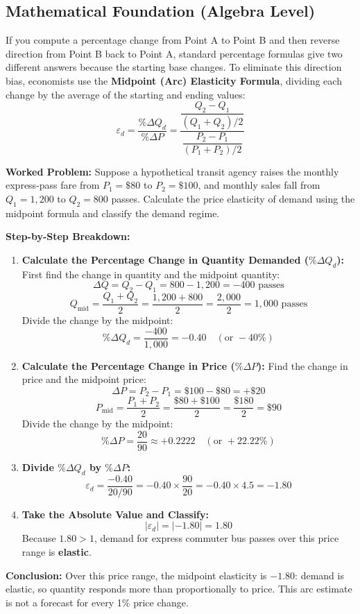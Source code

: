 \documentclass[11pt,letterpaper]{article}
\begin{document}
\subsection*{Mathematical Foundation (Algebra Level)}
If you compute a percentage change from Point A to Point B and then reverse direction from Point B back to Point A, standard percentage formulas give two different answers because the starting base changes. To eliminate this direction bias, economists use the \textbf{Midpoint (Arc) Elasticity Formula}, dividing each change by the average of the starting and ending values:
\begin{equation}
\varepsilon_d = \frac{\%\Delta Q_d}{\%\Delta P} = \frac{\dfrac{Q_2 - Q_1}{(Q_1 + Q_2)/2}}{\dfrac{P_2 - P_1}{(P_1 + P_2)/2}}
\end{equation}

\noindent\textbf{Worked Problem:}
Suppose a hypothetical transit agency raises the monthly express-pass fare from $P_1 = \$80$ to $P_2 = \$100$, and monthly sales fall from $Q_1 = 1{,}200$ to $Q_2 = 800$ passes. Calculate the price elasticity of demand using the midpoint formula and classify the demand regime.

\noindent\textbf{Step-by-Step Breakdown:}
\begin{enumerate}
    \item \textbf{Calculate the Percentage Change in Quantity Demanded ($\%\Delta Q_d$):}
    First find the change in quantity and the midpoint quantity:
    \[
    \Delta Q = Q_2 - Q_1 = 800 - 1{,}200 = -400\text{ passes}
    \]
    \[
    Q_{\text{mid}} = \frac{Q_1 + Q_2}{2} = \frac{1{,}200 + 800}{2} = \frac{2{,}000}{2} = 1{,}000\text{ passes}
    \]
    Divide the change by the midpoint:
    \[
    \%\Delta Q_d = \frac{-400}{1{,}000} = -0.40 \quad (\text{or } -40\%)
    \]

    \item \textbf{Calculate the Percentage Change in Price ($\%\Delta P$):}
    Find the change in price and the midpoint price:
    \[
    \Delta P = P_2 - P_1 = \$100 - \$80 = +\$20
    \]
    \[
    P_{\text{mid}} = \frac{P_1 + P_2}{2} = \frac{\$80 + \$100}{2} = \frac{\$180}{2} = \$90
    \]
    Divide the change by the midpoint:
    \[
    \%\Delta P = \frac{20}{90} \approx +0.2222 \quad (\text{or } +22.22\%)
    \]

    \item \textbf{Divide $\%\Delta Q_d$ by $\%\Delta P$:}
    \[
    \varepsilon_d = \frac{-0.40}{20/90} = -0.40 \times \frac{90}{20} = -0.40 \times 4.5 = -1.80
    \]

    \item \textbf{Take the Absolute Value and Classify:}
    \[
    |\varepsilon_d| = |-1.80| = \mathbf{1.80}
    \]
    Because $1.80 > 1$, demand for express commuter bus passes over this price range is \textbf{elastic}.
\end{enumerate}
\textbf{Conclusion:} Over this price range, the midpoint elasticity is $-1.80$: demand is elastic, so quantity responds more than proportionally to price. This arc estimate is not a forecast for every 1\% price change.
\end{document}
